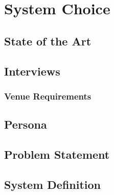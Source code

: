 \chapter{System Choice}


\section{State of the Art}
\label{StateOfTheArt}


\section{Interviews}





\subsection{Venue Requirements}


\section{Persona}


\section{Problem Statement}
\label{ProblemStatement}


\section{System Definition}

